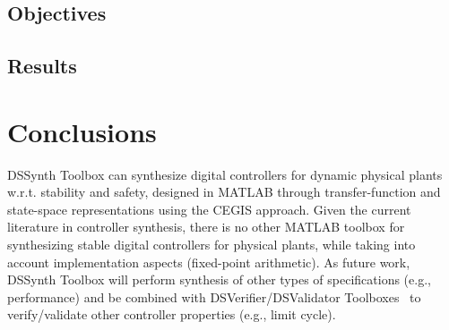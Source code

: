 \documentclass[10pt,conference]{IEEEtran}
\newcommand\tool{{DSSynth Toolbox}\xspace}
\begin{document}
\subsection{Objectives}


\subsection{Results}


\section{Conclusions}

\tool can synthesize digital controllers for dynamic physical plants 
w.r.t. stability and safety, designed in MATLAB through transfer-function 
and state-space representations using the CEGIS approach.
%
Given the current literature in controller synthesis, there is no other MATLAB toolbox 
for synthesizing stable digital controllers for physical plants, while taking into account implementation 
aspects (fixed-point arithmetic). 
%
As future work, \tool will perform synthesis of other types of specifications (e.g., performance) 
and be combined with DSVerifier/DSValidator Toolboxes~\cite{issta2017,dsvalidator} to verify/validate
 other controller properties (e.g., limit cycle). 


 
\end{document}
